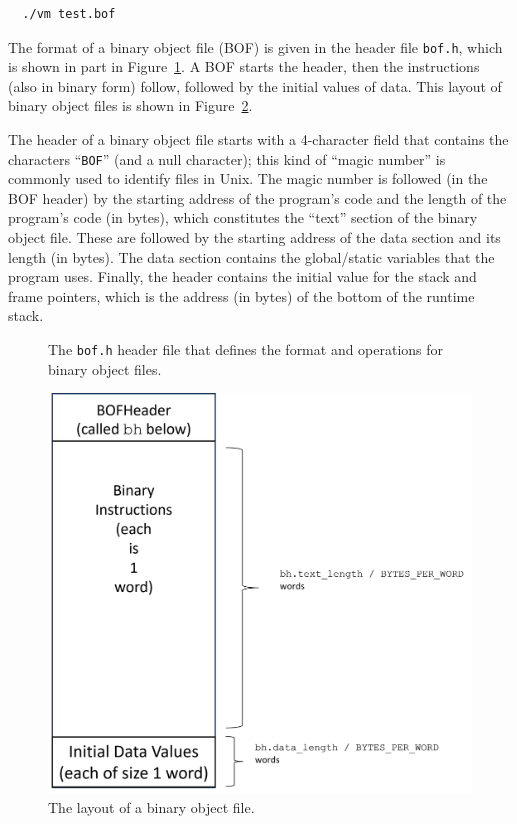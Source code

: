 \documentclass[11pt,letterpaper]{article}
\newcommand{\LSTCFILESLICE}[2]{

}
\newcommand{\figref}[1]{Figure~\ref{#1}}  %
\begin{document}
\begin{lstlisting}
  ./vm test.bof
\end{lstlisting}

The format of a binary object file (BOF) is given in the header file
\texttt{bof.h}, which is shown in part in \figref{fig:bofh}.
A BOF starts the header, then the instructions (also in
binary form) follow, followed by the initial values of data.
This layout of binary object files is shown in \figref{fig:boffilelayout}.

The header of a binary object file starts with a 4-character field
that contains the characters ``\lstinline!BOF!''
(and a null character); this kind of ``magic number'' is commonly used
to identify files in Unix.
The magic number is followed (in the BOF header) by the starting address of
the program's code and the length of the program's code (in bytes), which
constitutes the ``text'' section of the binary object file.
These are followed by the starting address of the data section and its
length (in bytes).
The data section contains the global/static variables that the program uses.
Finally, the header contains the initial value for the stack and frame
pointers, which is the address (in bytes) of the bottom of the runtime
stack.

\begin{figure}[htbp]
\LSTCFILESLICE{1-24,75-76}{bof.h}
\caption{The \texttt{bof.h} header file that defines the format and
  operations for binary object files.}
\label{fig:bofh}
\end{figure}

\begin{figure}[htbp]
\includegraphics*{BOF_layout.png}
\caption{The layout of a binary object file.}
\label{fig:boffilelayout}
\end{figure}
\end{document}
